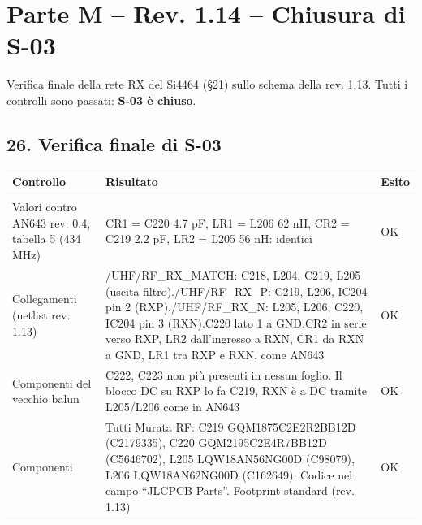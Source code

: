 \clearpage
\section[Parte M – Rev. 1.14 – Chiusura di S-03]{Parte M – Rev. 1.14 – Chiusura di S-03}

Verifica finale della rete RX del Si4464 (§21) sullo schema della rev. 1.13. Tutti i controlli sono passati: \textbf{S-03 è chiuso}.

\subsection[26. Verifica finale di S-03]{26. Verifica finale di S-03 }

{\small{}\setlength{\tabcolsep}{4pt}\renewcommand{\arraystretch}{1.1}
\begin{xltabular}{\linewidth}{>{\hsize\raggedright\arraybackslash}X>{\hsize\raggedright\arraybackslash}X>{\hsize\raggedright\arraybackslash}X}
\toprule
\textbf{Controllo} & \textbf{Risultato} & \textbf{Esito} \\
\midrule
\endhead
\midrule[0.15pt]\\\bottomrule\endfoot
\bottomrule\endlastfoot
Valori contro AN643 rev. 0.4, tabella 5 (434 MHz) & CR1 = C220 4.7 pF, LR1 = L206 62 nH, CR2 = C219 2.2 pF, LR2 = L205 56 nH: identici & OK \\\midrule[0.15pt]
Collegamenti (netlist rev. 1.13) & /\allowbreak{}UHF/\allowbreak{}RF\_\allowbreak{}RX\_\allowbreak{}MATCH: C218, L204, C219, L205 (uscita filtro).\newline{}/\allowbreak{}UHF/\allowbreak{}RF\_\allowbreak{}RX\_\allowbreak{}P: C219, L206, IC204 pin 2 (RXP).\newline{}/\allowbreak{}UHF/\allowbreak{}RF\_\allowbreak{}RX\_\allowbreak{}N: L205, L206, C220, IC204 pin 3 (RXN).\newline{}C220 lato 1 a GND.\newline{}CR2 in serie verso RXP, LR2 dall'ingresso a RXN, CR1 da RXN a GND, LR1 tra RXP e RXN, come AN643 & OK \\\midrule[0.15pt]
Componenti del vecchio balun & C222, C223 non più presenti in nessun foglio. Il blocco DC su RXP lo fa C219, RXN è a DC tramite L205/\allowbreak{}L206 come in AN643 & OK \\\midrule[0.15pt]
Componenti & Tutti Murata RF: C219 GQM1875C2E2R2BB12D (C2179335), C220 GQM2195C2E4R7BB12D (C5646702), L205 LQW18AN56NG00D (C98079), L206 LQW18AN62NG00D (C162649). Codice nel campo \textquotedblleft{}JLCPCB Parts\textquotedblright{}. Footprint standard (rev. 1.13) & OK \\\midrule[0.15pt]

\end{xltabular}}
